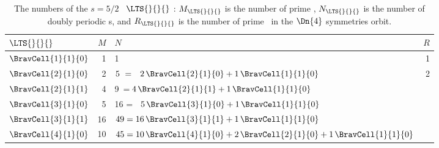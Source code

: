 
\begin{table}
\caption[]{\label{tab:LxTs=5/2}    \small
The numbers of the ${s}=5/2$ \catlatt\
$\LTS{}{}{}$ \twots: $M_{\LTS{}{}{}}$ is the
number of prime \twots, $N_{\LTS{}{}{}}$ is the
number of doubly periodic {\lattstate}s,
and $R_{\LTS{}{}{}}$ is the number of prime \twots\ in the
$\Dn{4}$ symmetries orbit.
}
\begin{center}
{\small
\begin{tabular}{lrlr}
\\[-16pt]
$\LTS{}{}{}$
                  & $M$ %
                         & $N$ %
                                                 &$R$\\
\hline
$\BravCell{1}{1}{0}$  &   1  &   1                   & 1 \\
$\BravCell{2}{1}{0}$  &   2  &
  $5~=\;\;\,2\,\BravCell{2}{1}{0}+1\,\BravCell{1}{1}{0}$
                                                 & 2 \\
$\BravCell{2}{1}{1}$&   4  & 9~\;=\;\;\,$
                           {4}\,\BravCell{2}{1}{1}
                         + {1}\,\BravCell{1}{1}{0}$
                                                 &   \\
$\BravCell{3}{1}{0}$  &   5  & 16 =~ ${5}\,\BravCell{3}{1}{0}
                         + {1}\,\BravCell{1}{1}{0}$
                                                 &   \\
$\BravCell{3}{1}{1}$&   16 & $49 =16\,\BravCell{3}{1}{1}
                         + {1}\,\BravCell{1}{1}{0}$
                                                 &   \\
$\BravCell{4}{1}{0}$  &  10 & $45 =10\,\BravCell{4}{1}{0} %
                         + {2}\,\BravCell{2}{1}{0}
                         + {1}\,\BravCell{1}{1}{0}$
                                                 &   \\

\end{tabular}}
\end{center}
\end{table}
